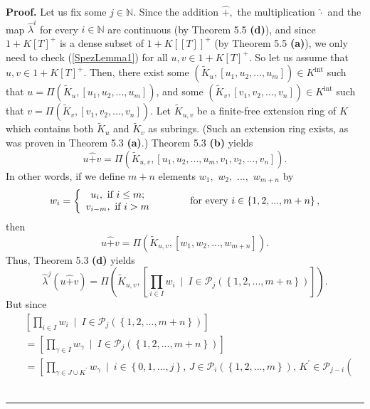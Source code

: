 \documentclass[numbers=enddot,12pt,final,onecolumn,notitlepage]{scrartcl}%
\newenvironment{proof}[1][Proof]{\noindent\textbf{#1.} }{\ \rule{0.5em}{0.5em}}
\begin{document}
\begin{proof}
Let us fix some $j\in\mathbb{N}$. Since the addition $\widehat{+},$ the
multiplication $\widehat{\cdot}$ and the map $\widehat{\lambda}^{i}$ for every
$i\in\mathbb{N}$ are continuous (by Theorem 5.5 \textbf{(d)}), and since
$1+K\left[  T\right]  ^{+}$ is a dense subset of $1+K\left[  \left[  T\right]
\right]  ^{+}$ (by Theorem 5.5 \textbf{(a)}), we only need to check
(\ref{SpezLemma1}) for all $u,v\in1+K\left[  T\right]  ^{+}$. So let us assume
that $u,v\in1+K\left[  T\right]  ^{+}$. Then, there exist some $\left(
\widetilde{K}_{u},\left[  u_{1},u_{2},...,u_{m}\right]  \right)  \in
K^{\operatorname*{int}}$ such that $u=\Pi\left(  \widetilde{K}_{u},\left[
u_{1},u_{2},...,u_{m}\right]  \right)  $, and some $\left(  \widetilde{K}%
_{v},\left[  v_{1},v_{2},...,v_{n}\right]  \right)  \in K^{\operatorname*{int}%
}$ such that $v=\Pi\left(  \widetilde{K}_{v},\left[  v_{1},v_{2}%
,...,v_{n}\right]  \right)  $. Let $\widetilde{K}_{u,v}$ be a finite-free
extension ring of $K$ which contains both $\widetilde{K}_{u}$ and
$\widetilde{K}_{v}$ as subrings. (Such an extension ring exists, as was proven
in Theorem 5.3 \textbf{(a)}.) Theorem 5.3 \textbf{(b)} yields%
\[
u\widehat{+}v=\Pi\left(  \widetilde{K}_{u,v},\left[  u_{1},u_{2}%
,...,u_{m},v_{1},v_{2},...,v_{n}\right]  \right)  .
\]
In other words, if we define $m+n$ elements $w_{1},$ $w_{2},$ $...,$ $w_{m+n}$
by
\[
w_{i}=\left\{
\begin{array}
[c]{c}%
u_{i},\text{ if }i\leq m;\\
v_{i-m},\text{ if }i>m
\end{array}
\right.  \ \ \ \ \ \ \ \ \ \ \text{for every }i\in\left\{
1,2,...,m+n\right\}  ,
\]
then%
\[
u\widehat{+}v=\Pi\left(  \widetilde{K}_{u,v},\left[  w_{1},w_{2}%
,...,w_{m+n}\right]  \right)  .
\]
Thus, Theorem 5.3 \textbf{(d)} yields%
\[
\widehat{\lambda}^{j}\left(  u\widehat{+}v\right)  =\Pi\left(  \widetilde{K}%
_{u,v},\left[  \prod\limits_{i\in I}w_{i}\ \mid\ I\in\mathcal{P}_{j}\left(
\left\{  1,2,...,m+n\right\}  \right)  \right]  \right)  .
\]
But since%
\begin{align*}
&  \left[  \prod\limits_{i\in I}w_{i}\ \mid\ I\in\mathcal{P}_{j}\left(
\left\{  1,2,...,m+n\right\}  \right)  \right] \\
&  =\left[  \prod\limits_{\gamma\in I}w_{\gamma}\ \mid\ I\in\mathcal{P}%
_{j}\left(  \left\{  1,2,...,m+n\right\}  \right)  \right] \\
&  =\left[  \prod\limits_{\gamma\in J\cup K^{\prime}}w_{\gamma}\ \mid
\ i\in\left\{  0,1,...,j\right\}  \text{, }J\in\mathcal{P}_{i}\left(  \left\{
1,2,...,m\right\}  \right)  \text{, }K^{\prime}\in\mathcal{P}_{j-i}\left(

\end{align*}
\end{proof}
\end{document}
